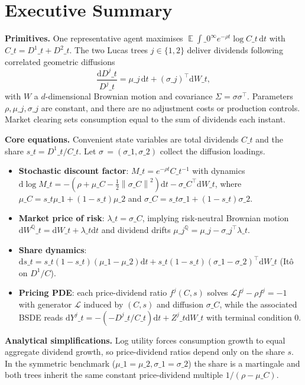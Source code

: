 ﻿\documentclass[11pt,letterpaper,oneside]{article}
\numberwithin{equation}{section}
\DeclareMathOperator{\E}{\mathbb{E}}
\newcommand{\1}{\mathbf{1}}
\newcommand{\diff}{\mathrm{d}}
\newcommand{\norm}[1]{\left\lVert #1\right\rVert}
\begin{document}
\section*{Executive Summary }
\begin{tcolorbox}[didacticstyle]
\textbf{Primitives.}
One representative agent maximises $\E\!\int\_0^\infty e^{-\rho t}\log C\_t\,\diff t$ with $C\_t=D^1\_t+D^2\_t$. The two Lucas trees $j\in\{1,2\}$ deliver dividends following correlated geometric diffusions
\[
\frac{\diff D^j\_t}{D^j\_t}=\mu\_j\,\diff t+ (\sigma\_j)^{\top}\diff W\_t,
\]
with $W$ a $d$-dimensional Brownian motion and covariance $\Sigma=\sigma\sigma^{\top}$. Parameters $\rho,\mu\_j,\sigma\_j$ are constant, and there are no adjustment costs or production controls. Market clearing sets consumption equal to the sum of dividends each instant.
\medskip

\textbf{Core equations.} Convenient state variables are total dividends $C\_t$ and the share $s\_t=D^1\_t/C\_t$. Let $\sigma\,=(\sigma\_1,\sigma\_2)$ collect the diffusion loadings.
\begin{itemize}[leftmargin=1.25em]
\item \textbf{Stochastic discount factor}: $M\_t=e^{-\rho t}C\_t^{-1}$ with dynamics $\diff\log M\_t=-(\rho+\mu\_C-\tfrac12\norm{\sigma\_C}^2)\diff t-\sigma\_C^{\top}\diff W\_t$, where $\mu\_C=s\_t\mu\_1+(1-s\_t)\mu\_2$ and $\sigma\_C=s\_t\sigma\_1+(1-s\_t)\sigma\_2$.
\item \textbf{Market price of risk}: $\lambda\_t=\sigma\_C$, implying risk-neutral Brownian motion $\diff W^{\mathbb{Q}}\_t=\diff W\_t+\lambda\_t\diff t$ and dividend drifts $\mu\_j^{\mathbb{Q}}=\mu\_j-\sigma\_j^{\top}\lambda\_t$.
\item \textbf{Share dynamics}: $\diff s\_t=s\_t(1-s\_t)(\mu\_1-\mu\_2)\diff t+s\_t(1-s\_t)(\sigma\_1-\sigma\_2)^{\top}\diff W\_t$ (It\^o on $D^1/C$).
\item \textbf{Pricing PDE}: each price-dividend ratio $f^j(C,s)$ solves $\mathcal{L}f^j-\rho f^j=-1$ with generator $\mathcal{L}$ induced by $(C,s)$ and diffusion $\sigma\_C$, while the associated BSDE reads $\diff Y^j\_t=-(-D^j\_t/C\_t)\diff t+Z^j\_t\diff W\_t$ with terminal condition $0$.
\end{itemize}

\textbf{Analytical simplifications.} Log utility forces consumption growth to equal aggregate dividend growth, so price-dividend ratios depend only on the share $s$. In the symmetric benchmark ($\mu\_1=\mu\_2,\sigma\_1=\sigma\_2$) the share is a martingale and both trees inherit the same constant price-dividend multiple $1/(\rho-\mu\_C)$.


\end{tcolorbox}
\end{document}
